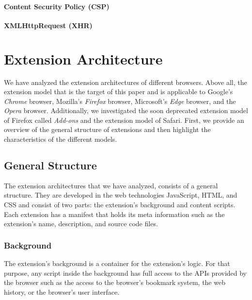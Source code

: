 \paragraph{Content Security Policy (CSP)}

\paragraph{XMLHttpRequest (XHR)}



\newpage
\section{Extension Architecture}
	
	We have analyzed the extension architectures of different browsers. Above all, the extension model that is the target of this paper and is applicable to Google's \textit{Chrome} browser, Mozilla's \textit{Firefox} browser, Microsoft's \textit{Edge} browser, and the \textit{Opera} browser. Additionally, we investigated the soon deprecated extension model of Firefox called \textit{Add-ons} and the extension model of Safari. First, we provide an overview of the general structure of extensions and then highlight the characteristics of the different models.
	
\subsection{General Structure} %

	The extension architectures that we have analyzed, consists of a general structure. They are developed in the web technologies JavaScript, HTML, and CSS and consist of two parts: the extension's background and content scripts. Each extension has a manifest that holds its meta information such as the extension's name, description, and source code files.
	
\subsubsection{Background}

	The extension's background is a container for the extension's logic. For that purpose, any script inside the background has full access to the APIs provided by the browser such as the access to the browser's bookmark system, the web history, or the browser's user interface.
	
